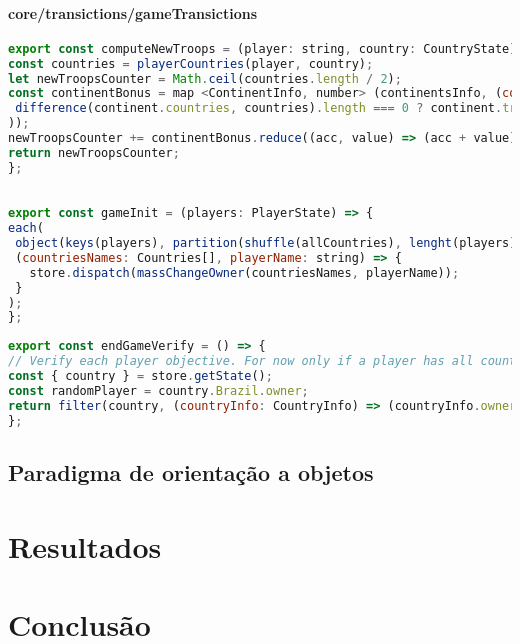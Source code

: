 \documentclass[rel_mlp]{iiufrgs}
\begin{document}
\subsubsection{core/transictions/gameTransictions}
\begin{lstlisting}[language=JavaScript]
export const computeNewTroops = (player: string, country: CountryState) => {
const countries = playerCountries(player, country);
let newTroopsCounter = Math.ceil(countries.length / 2);
const continentBonus = map <ContinentInfo, number> (continentsInfo, (continent: ContinentInfo) => (
 difference(continent.countries, countries).length === 0 ? continent.troopsBonus : 0
));
newTroopsCounter += continentBonus.reduce((acc, value) => (acc + value), 0);
return newTroopsCounter;
};
\end{lstlisting}
\begin{lstlisting}[language = JavaScript]

export const gameInit = (players: PlayerState) => {
each(
 object(keys(players), partition(shuffle(allCountries), lenght(players))) as InitCountries,
 (countriesNames: Countries[], playerName: string) => {
   store.dispatch(massChangeOwner(countriesNames, playerName));
 }
);
};
\end{lstlisting}
\begin{lstlisting}[language = JavaScript]
export const endGameVerify = () => {
// Verify each player objective. For now only if a player has all countries
const { country } = store.getState();
const randomPlayer = country.Brazil.owner;
return filter(country, (countryInfo: CountryInfo) => (countryInfo.owner !== randomPlayer)) === [];
};


\end{lstlisting}

\section{Paradigma de orientação a objetos}

\chapter{Resultados}

\chapter{Conclusão}


\end{document}
